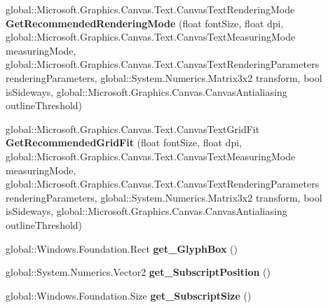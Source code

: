 \begin{DoxyCompactItemize}
global\+::\+Microsoft.\+Graphics.\+Canvas.\+Text.\+Canvas\+Text\+Rendering\+Mode {\bfseries Get\+Recommended\+Rendering\+Mode} (float font\+Size, float dpi, global\+::\+Microsoft.\+Graphics.\+Canvas.\+Text.\+Canvas\+Text\+Measuring\+Mode measuring\+Mode, global\+::\+Microsoft.\+Graphics.\+Canvas.\+Text.\+Canvas\+Text\+Rendering\+Parameters rendering\+Parameters, global\+::\+System.\+Numerics.\+Matrix3x2 transform, bool is\+Sideways, global\+::\+Microsoft.\+Graphics.\+Canvas.\+Canvas\+Antialiasing outline\+Threshold)
\item 
\mbox{\label{class_microsoft_1_1_graphics_1_1_canvas_1_1_text_1_1_canvas_font_face_a2ce24a3338c9801d118760da55d735a1}} 
global\+::\+Microsoft.\+Graphics.\+Canvas.\+Text.\+Canvas\+Text\+Grid\+Fit {\bfseries Get\+Recommended\+Grid\+Fit} (float font\+Size, float dpi, global\+::\+Microsoft.\+Graphics.\+Canvas.\+Text.\+Canvas\+Text\+Measuring\+Mode measuring\+Mode, global\+::\+Microsoft.\+Graphics.\+Canvas.\+Text.\+Canvas\+Text\+Rendering\+Parameters rendering\+Parameters, global\+::\+System.\+Numerics.\+Matrix3x2 transform, bool is\+Sideways, global\+::\+Microsoft.\+Graphics.\+Canvas.\+Canvas\+Antialiasing outline\+Threshold)
\item 
\mbox{\label{class_microsoft_1_1_graphics_1_1_canvas_1_1_text_1_1_canvas_font_face_acb94b128fcfcaf9dbc548d25e99472c6}} 
global\+::\+Windows.\+Foundation.\+Rect {\bfseries get\+\_\+\+Glyph\+Box} ()
\item 
\mbox{\label{class_microsoft_1_1_graphics_1_1_canvas_1_1_text_1_1_canvas_font_face_a5f408416515ec6586dd3e0c9af647b11}} 
global\+::\+System.\+Numerics.\+Vector2 {\bfseries get\+\_\+\+Subscript\+Position} ()
\item 
\mbox{\label{class_microsoft_1_1_graphics_1_1_canvas_1_1_text_1_1_canvas_font_face_a9daf64397950efa34d38cadf0f1a84b4}} 
global\+::\+Windows.\+Foundation.\+Size {\bfseries get\+\_\+\+Subscript\+Size} ()
\item 
\mbox{\label{class_microsoft_1_1_graphics_1_1_canvas_1_1_text_1_1_canvas_font_face_aca5ca3fb08405e2a07babb29811efd2f}} 

\end{DoxyCompactItemize}
